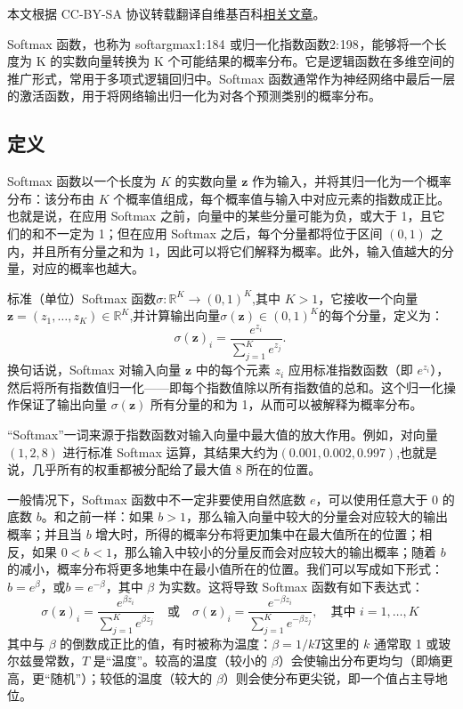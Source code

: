 
本文根据 CC-BY-SA 协议转载翻译自维基百科\href{https://en.wikipedia.org/wiki/Softmax_function}{相关文章}。

Softmax 函数，也称为 softargmax1: 184  或归一化指数函数2: 198 ，能够将一个长度为 K 的实数向量转换为 K 个可能结果的概率分布。它是逻辑函数在多维空间的推广形式，常用于多项式逻辑回归中。Softmax 函数通常作为神经网络中最后一层的激活函数，用于将网络输出归一化为对各个预测类别的概率分布。
\subsection{定义}
Softmax 函数以一个长度为 $K$ 的实数向量 $\mathbf{z}$ 作为输入，并将其归一化为一个概率分布：该分布由 $K$ 个概率值组成，每个概率值与输入中对应元素的指数成正比。也就是说，在应用 Softmax 之前，向量中的某些分量可能为负，或大于 1，且它们的和不一定为 1；但在应用 Softmax 之后，每个分量都将位于区间 $(0, 1)$ 之内，并且所有分量之和为 1，因此可以将它们解释为概率。此外，输入值越大的分量，对应的概率也越大。

标准（单位）Softmax 函数$\sigma: \mathbb{R}^K \to (0,1)^K$,其中 $K > 1$，它接收一个向量$\mathbf{z} = (z_1, \dotsc, z_K) \in \mathbb{R}^K$,并计算输出向量$\sigma(\mathbf{z}) \in (0,1)^K$的每个分量，定义为：
$$
\sigma(\mathbf{z})_i = \frac{e^{z_i}}{\sum_{j=1}^{K} e^{z_j}}.~
$$
换句话说，Softmax 对输入向量 $\mathbf{z}$ 中的每个元素 $z_i$ 应用标准指数函数（即 $e^{z_i}$），然后将所有指数值归一化——即每个指数值除以所有指数值的总和。这个归一化操作保证了输出向量 $\sigma(\mathbf{z})$ 所有分量的和为 1，从而可以被解释为概率分布。

“Softmax”一词来源于指数函数对输入向量中最大值的放大作用。例如，对向量 $(1, 2, 8)$ 进行标准 Softmax 运算，其结果大约为$(0.001, 0.002, 0.997)$,也就是说，几乎所有的权重都被分配给了最大值 8 所在的位置。

一般情况下，Softmax 函数中不一定非要使用自然底数 $e$，可以使用任意大于 0 的底数 $b$。和之前一样：如果 $b > 1$，那么输入向量中较大的分量会对应较大的输出概率；并且当 $b$ 增大时，所得的概率分布将更加集中在最大值所在的位置；相反，如果 $0 < b < 1$，那么输入中较小的分量反而会对应较大的输出概率；随着 $b$ 的减小，概率分布将更多地集中在最小值所在的位置。我们可以写成如下形式：$b = e^{\beta}$，或$b = e^{-\beta}$，其中 $\beta$ 为实数。这将导致 Softmax 函数有如下表达式：
$$
\sigma(\mathbf{z})_i = \frac{e^{\beta z_i}}{\sum_{j=1}^{K} e^{\beta z_j}} \quad \text{或} \quad \sigma(\mathbf{z})_i = \frac{e^{-\beta z_i}}{\sum_{j=1}^{K} e^{-\beta z_j}}, \quad \text{其中 } i = 1, \dotsc, K~
$$
其中与 $\beta$ 的倒数成正比的值，有时被称为温度：$\beta = 1/kT$这里的 $k$ 通常取 1 或玻尔兹曼常数，$T$ 是“温度”。较高的温度（较小的 $\beta$）会使输出分布更均匀（即熵更高，更“随机”）；较低的温度（较大的 $\beta$）则会使分布更尖锐，即一个值占主导地位。

